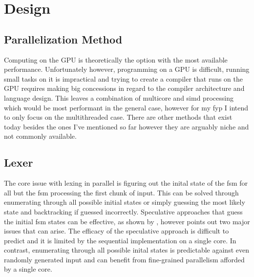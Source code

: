 \chapter{Design} \label{design}
\begin{comment}
\begin{itemize}
	\item Discuss the various approaches mentioned in the literature review, mentioning
		  their pros and cons. Write about the issues with designing a parallel compiler,
		  e.g issues common to all approaches. Elaborate on why tech choices are being
		  made e.g using rust. 
	\item Discuss my plan / design for the compiler.
\end{itemize}


\end{comment}

\section{Parallelization Method} \label{design_parallel_method}

Computing on the GPU is theoretically the option with the most available
performance. Unfortunately however, programming on a GPU is difficult, running
small tasks on it is impractical and trying to create a compiler that runs
on the GPU requires making big concessions in regard to the compiler
architecture and language design. This leaves a combination of multicore and
\gls{simd} processing which would be most performant in the general case,
however for my \gls{fyp} I intend to only focus on the multithreaded case.
There are other methods that exist today besides the ones I’ve mentioned so far
however they are arguably niche and not commonly available.

\section{Lexer} \label{lexer}

The core issue with lexing in parallel is figuring out the inital state
of the \gls{fsm} for all but the \gls{fsm} processing the first chunk of
input. This can be solved through enumerating through all possible initial
states or simply guessing the most likely state and backtracking if guessed
incorrectly. Speculative approaches that guess the initial \gls{fsm} states
can be effective, as shown by \cite{luchaup_speculative_2011}, however
\cite{mytkowicz_data-parallel_2014} points out two major issues that can
arise. The efficacy of the speculative approach is difficult to predict and
it is limited by the sequential implementation on a single core. In contrast,
enumerating through all possible inital states is predictable against even
randomly generated input and can benefit from fine-grained parallelism afforded
by a single core.

